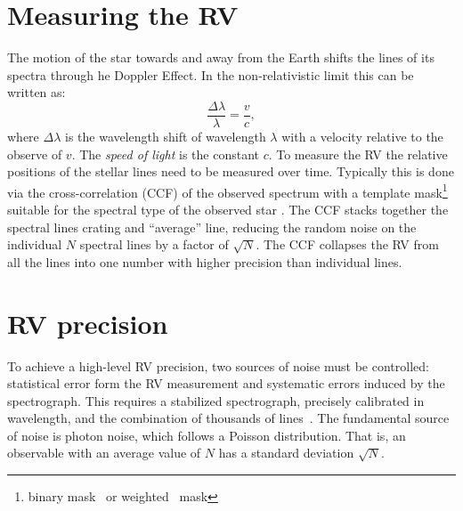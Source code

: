 
\section{Measuring the RV}
The motion of the star towards and away from the Earth shifts the lines of its spectra through he Doppler Effect.
In the non-relativistic limit this can be written as:
\begin{equation}
\frac{\Delta\lambda}{\lambda} = \frac{v}{c},
\end{equation}
where $\Delta\lambda$ is the wavelength shift of wavelength $\lambda$ with a velocity relative to the observe of \(v\).
The \emph{speed of light} is the constant $c$.
To measure the RV the relative positions of the stellar lines need to be measured over time.
Typically this is done via the cross-correlation ({CCF}) of the observed spectrum with a template mask\footnote{binary mask~\citep{baranne 1996} or weighted~\citep{pepe 2002} mask} suitable for the spectral type of the observed star \citep[e.g.][]{Baranne 1996, pepe 2002}.
The {CCF} stacks together the spectral lines crating and ``average'' line, reducing the random noise on the individual $N$ spectral lines by a factor of $\sqrt{N}$.
The {CCF} collapses the RV from all the lines into one number with higher precision than individual lines.


\section{RV precision}
\label{section:rv_precision}
To achieve a high-level RV precision, two sources of noise must be controlled: statistical error form the RV measurement and systematic errors induced by the spectrograph.
This requires a stabilized spectrograph, precisely calibrated in wavelength, and the combination of thousands of lines~\citep[e.g.][]{pepe_instrumentation_2014}.
The fundamental source of noise is photon noise, which follows a {Poisson} distribution.
That is, an observable with an average value of $N$ has a standard deviation $\sqrt{N}$.

